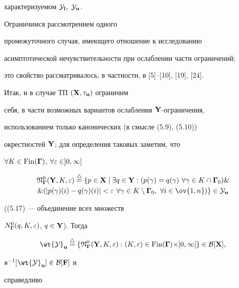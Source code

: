характеризуемом ${{\cal Y}_{\bold l}},\;{{\cal Y}_{\bold u}}$.


Ограничимся рассмотрением одного


промежуточного случая, имеющего отношение к исследованию


асимптотической нечувствительности при ослаблении части ограничений;


это свойство рассматривалось, в частности, в [5]--[10], [19], [24].


Итак, и в случае ТП $({\bold X},{\tau}_{\bold u})$ ограничим


себя, в части возможных вариантов ослабления ${\bold Y}$-ограничения,


использованием только канонических (в смысле (5.9), (5.10))


окрестностей ${\bold Y}$; для определения таковых заметим, что


$\forall{K} \in {\operatorname{Fin}}(\boldsymbol \Gamma)$, $\forall{\varepsilon} \in ]0,\infty[$


\begin{multline}


{{\frak N}_{\mG}^0}({\bold Y},K,\var) \stac \{p \in {\bold X} \mid


\exi{q} \in {\bold Y}:({p(\gamma)} = {q(\gamma)}


\ \fo{\gamma} \in K \cap {{\mG}_0}) \& \\


\&


(|{p(\gamma)(i)} - {q(\gamma)(i)}| <


\var\ \fo{\gamma} \in K \setminus {{\mG}_0},


\ \fo{i} \in \ov{1,n})\} \in {{\cal Y}_{\bold u}}


\end{multline}


((5.17) --- объединение всех множеств


${N_{\boldsymbol \Gamma}^0}(q,K,\varepsilon)$, $q \in {\bold Y}$). Тогда


\begin{equation}


{{\wt {\cal Y}}_{\bold u}} \stac \{{{\frak N}_{\mG}^0}({\bold Y},K,\var):


(K,\var) \in {\Fin}(\mG) \times ]0,\infty[\} \in {{\cal B}[{\bold X}]},


\end{equation}


${{\bold s}^{-1}}[{\wt {\cal Y}}_{\bold u}] \in {{\cal B}[{\bold F}]}$ и


справедливо





